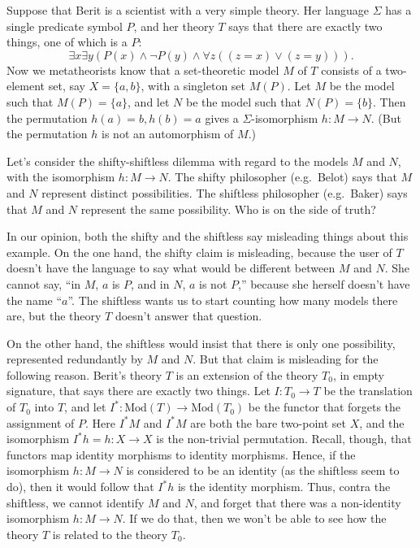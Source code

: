 \begin{example} Suppose that Berit is a scientist with a very simple
  theory.  Her language $\Sigma$ has a single predicate symbol $P$,
  and her theory $T$ says that there are exactly two things, one of
  which is a $P$:
  \[ \exists x\exists y(P(x)\wedge \neg P(y)\wedge \forall z((z=x)\vee
    (z=y))) .\] Now we metatheorists know that a set-theoretic model
  $M$ of $T$ consists of a two-element set, say $X=\{ a,b\}$, with a
  singleton set $M(P)$.  Let $M$ be the model such that $M(P)=\{ a\}$,
  and let $N$ be the model such that $N(P)=\{ b\}$.  Then the
  permutation $h(a)=b,h(b)=a$ gives a $\Sigma$-isomorphism $h:M\to N$.
  (But the permutation $h$ is not an automorphism of $M$.)

  Let's consider the shifty-shiftless dilemma with regard to the
  models $M$ and $N$, with the isomorphism $h:M\to N$.  The shifty
  philosopher (e.g.\ Belot) says that $M$ and $N$ represent distinct
  possibilities.  The shiftless philosopher (e.g.\ Baker) says that
  $M$ and $N$ represent the same possibility.  Who is on the side of
  truth?

  In our opinion, both the shifty and the shiftless say misleading
  things about this example.  On the one hand, the shifty claim is
  misleading, because the user of $T$ doesn't have the language to say
  what would be different between $M$ and $N$.  She cannot say, ``in
  $M$, $a$ is $P$, and in $N$, $a$ is not $P$,'' because she herself
  doesn't have the name ``$a$''.  The shiftless wants us to start
  counting how many models there are, but the theory $T$ doesn't
  answer that question.

  On the other hand, the shiftless would insist that there is only one
  possibility, represented redundantly by $M$ and $N$.  But that claim
  is misleading for the following reason.  Berit's theory $T$ is an
  extension of the theory $T_0$, in empty signature, that says there
  are exactly two things.  Let $I:T_0\to T$ be the translation of
  $T_0$ into $T$, and let $I^*:\mathrm{Mod}(T)\to\mathrm{Mod}(T_0)$ be
  the functor that forgets the assignment of $P$.  Here $I^*M$ and
  $I^*M$ are both the bare two-point set $X$, and the isomorphism
  $I^*h=h:X\to X$ is the non-trivial permutation.  Recall, though,
  that functors map identity morphisms to identity morphisms.  Hence,
  if the isomorphism $h:M\to N$ is considered to be an identity (as
  the shiftless seem to do), then it would follow that $I^*h$ is the
  identity morphism.  Thus, contra the shiftless, we cannot identify
  $M$ and $N$, and forget that there was a non-identity isomorphism
  $h:M\to N$.  If we do that, then we won't be able to see how the
  theory $T$ is related to the theory $T_0$.


\end{example}
